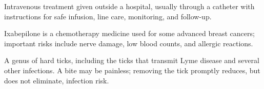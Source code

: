  Intravenous treatment given outside a hospital, usually through a catheter with instructions for safe infusion, line care, monitoring, and follow-up.

 Ixabepilone is a chemotherapy medicine used for some advanced breast cancers; important risks include nerve damage, low blood counts, and allergic reactions.

 A genus of hard ticks, including the ticks that transmit Lyme disease and several other infections. A bite may be painless; removing the tick promptly reduces, but does not eliminate, infection risk.
